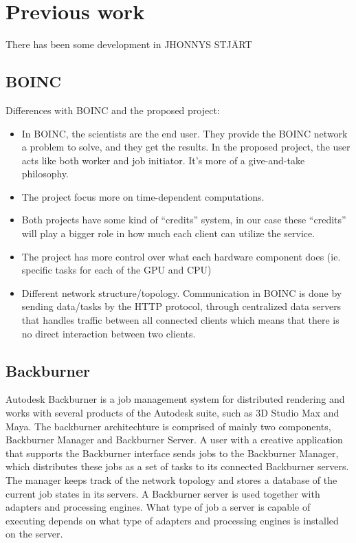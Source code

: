 \chapter{Previous work}
There has been some development in JHONNYS STJÄRT

\section{BOINC}

Differences with BOINC and the proposed project:
\begin{itemize}
	\item In BOINC, the scientists are the end user. They provide the BOINC network
		a problem to solve, and they get the results. In the proposed project, 
		the user acts like both worker and job initiator. It’s more of a 
		give-and-take philosophy.
	\item The project focus more on time-dependent computations.
	\item Both projects have some kind of “credits” system, in our case these
		“credits” will play a bigger role in how much each client can utilize
		the service.
	\item The project has more control over what each hardware component does
		(ie. specific tasks for each of the GPU and CPU)
	\item Different network structure/topology. Communication in BOINC is done
		by sending data/tasks by the HTTP protocol, through centralized data
		servers that handles traffic between all connected clients which means 
		that there is no direct interaction between two clients. 
\end{itemize}

\section{Backburner}

Autodesk Backburner is a job management system for distributed rendering and works with several products of the Autodesk suite, such as 3D Studio Max and Maya. The backburner architechture is comprised of mainly two components, Backburner Manager and Backburner Server. A user with a creative application that supports the Backburner interface sends jobs to the Backburner Manager, which distributes these jobs as a set of tasks to its connected Backburner servers. The manager keeps track of the network topology and stores a database of the current job states in its servers. A Backburner server is used together with adapters and processing engines. What type of job a server is capable of executing depends on what type of adapters and processing engines is installed on the server. 

